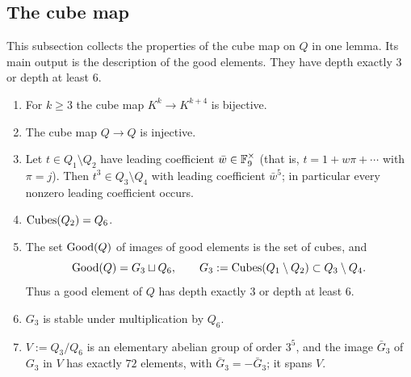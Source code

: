 \subsection{The cube map}
This subsection collects the properties of the cube map on $Q$ in one lemma. Its main output is the description of the good elements. They have depth exactly $3$ or depth at least $6$.

\begin{lemma}\label{W:lem:cube}
\begin{enumerate}[label=(\alph*)]
\item For $k\ge3$ the cube map $K^k\to K^{k+4}$ is bijective.
\item The cube map $Q\to Q$ is injective.
\item Let $t\in Q_1\setminus Q_2$ have leading coefficient
$\bar w\in\mathbb F_9^\times$ (that is, $t=1+w\pi+\cdots$ with $\pi=j$).
Then $t^3\in Q_3\setminus Q_4$ with leading coefficient $\bar w^{5}$;
in particular every nonzero leading coefficient occurs.
\item $\mathrm{Cubes}(Q_2)=Q_6$.
\item The set $\mathrm{Good}(Q)$ of images of good elements is the set of cubes,
and
\[
 \mathrm{Good}(Q)=G_3\sqcup Q_6,\qquad G_3:=\mathrm{Cubes}(Q_1\setminus Q_2)\subset Q_3\setminus Q_4 .
\]
Thus a good element of $Q$ has depth exactly $3$ or depth at least $6$.
\item $G_3$ is stable under multiplication by $Q_6$.
\item $V:=Q_3/Q_6$ is an elementary abelian group of order $3^5$, and
the image $\bar G_3$ of $G_3$ in $V$ has exactly $72$ elements, with
$\bar G_3=-\bar G_3$; it spans $V$.
\end{enumerate}
\end{lemma}
